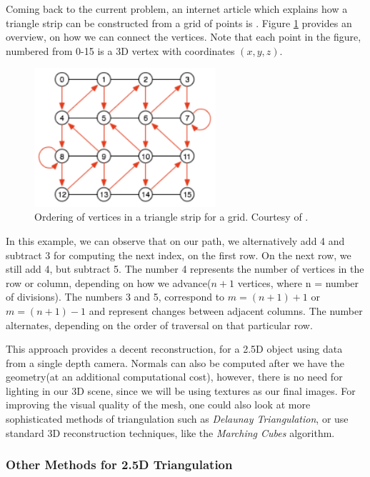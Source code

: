 \documentclass[]{article}
\begin{document}
Coming back to the current problem, an internet article which explains how a triangle strip can be constructed from a grid of points is \cite{triangleStrip}. Figure \ref{fig:TriangleStrip} provides an overview, on how we can connect the vertices. Note that each point in the figure, numbered from 0-15 is a 3D vertex with coordinates $(x,y,z)$. 

\begin{figure}[hbtp]
    \centering
    \includegraphics[width=0.6\textwidth]{figures/TriangleStripOrdering.PNG}
    \caption{Ordering of vertices in a triangle strip for a grid. Courtesy of \cite{triangleStrip}.}
    \label{fig:TriangleStrip}
\end{figure}

In this example, we can observe that on our path, we alternatively add 4 and subtract 3 for computing the next index, on the first row. On the next row, we still add 4, but subtract 5. The number 4 represents the number of vertices in the row or column, depending on how we advance($n + 1$ vertices, where n = number of divisions).
The numbers 3 and 5, correspond to $m = (n+1) + 1$ or $m = (n+1) - 1$ and represent changes between adjacent columns. The number alternates, depending on the order of traversal on that particular row.

This approach provides a decent reconstruction, for a 2.5D object using data from a single depth camera. Normals can also be computed after we have the geometry(at an additional computational cost), however, there is no need for lighting in our 3D scene, since we will be using textures as our final images. For improving the visual quality of the mesh, one could also look at more sophisticated methods of triangulation such as \textit{Delaunay Triangulation}, or use standard 3D reconstruction techniques, like the \textit{Marching Cubes} algorithm.

\subsubsection{Other Methods for 2.5D Triangulation}
\end{document}
